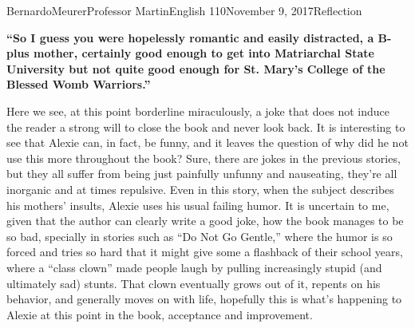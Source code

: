 \documentclass[12pt,letterpaper]{article}
\begin{document}
    \begin{mla}{Bernardo}{Meurer}{Professor Martin}{English 110}{November 9, 2017}{Reflection}
    \begin{singlespace}
        \textbf{``So I guess you were hopelessly romantic and easily distracted, a B-plus mother, certainly good enough to get into Matriarchal State University but not quite good enough for St. Mary’s College of the Blessed Womb Warriors.''}
    \end{singlespace}
    
    Here we see, at this point borderline miraculously, a joke that does not induce the reader a strong will to close the book and never look back. It is interesting to see that Alexie can, in fact, be funny, and it leaves the question of why did he not use this more throughout the book? Sure, there are jokes in the previous stories, but they all suffer from being just painfully unfunny and nauseating, they're all inorganic and at times repulsive. Even in this story, when the subject describes his mothers' insults, Alexie uses his usual failing humor. It is uncertain to me, given that the author can clearly write a good joke, how the book manages to be so bad, specially in stories such as ``Do Not Go Gentle,'' where the humor is so forced and tries so hard that it might give some a flashback of their school years, where a ``class clown'' made people laugh by pulling increasingly stupid (and ultimately sad) stunts. That clown eventually grows out of it, repents on his behavior, and generally moves on with life, hopefully this is what's happening to Alexie at this point in the book, acceptance and improvement.
    
    \end{mla}
    
\end{document}
